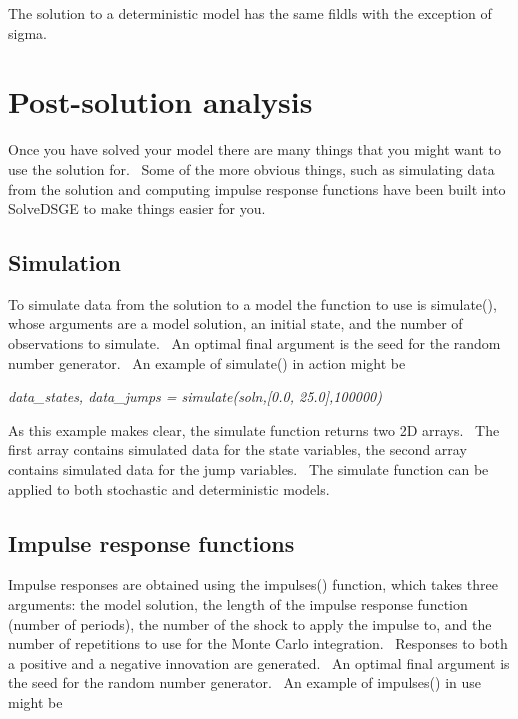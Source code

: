 \documentclass[notitlepage,11pt]{article}
\begin{document}
The solution to a deterministic model has the same fildls with the exception
of sigma.

\section{Post-solution analysis}

Once you have solved your model there are many things that you might want to
use the solution for. \ Some of the more obvious things, such as simulating
data from the solution and computing impulse response functions have been
built into SolveDSGE to make things easier for you.

\subsection{Simulation}

To simulate data from the solution to a model the function to use is
simulate(), whose arguments are a model solution, an initial state, and the
number of observations to simulate. \ An optimal final argument is the seed
for the random number generator. \ An example of simulate() in action might
be

\bigskip

\textit{data\_states, data\_jumps = simulate(soln,[0.0, 25.0],100000)}

\bigskip

As this example makes clear, the simulate function returns two 2D arrays. \
The first array contains simulated data for the state variables, the second
array contains simulated data for the jump variables. \ The simulate
function can be applied to both stochastic and deterministic models.

\subsection{Impulse response functions}

Impulse responses are obtained using the impulses() function, which takes
three arguments: the model solution, the length of the impulse response
function (number of periods), the number of the shock to apply the impulse
to, and the number of repetitions to use for the Monte Carlo integration. \
Responses to both a positive and a negative innovation are generated. \ An
optimal final argument is the seed for the random number generator. \ An
example of impulses() in use might be

\bigskip
\end{document}
